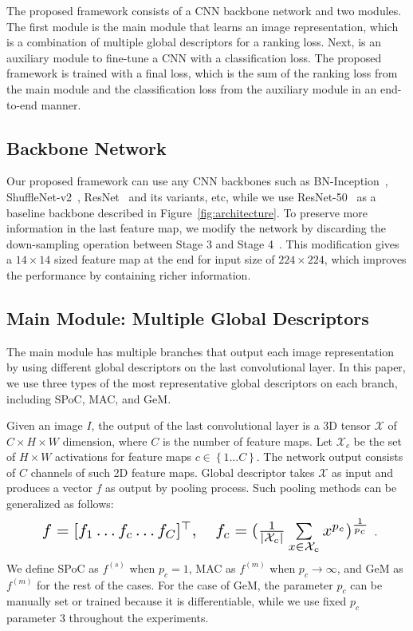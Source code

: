 \documentclass[10pt,twocolumn,letterpaper]{article}
\begin{document}
\begin{CJK}{UTF8}{mj}
The proposed framework consists of a CNN backbone network and two modules.
The first module is the main module that learns an image representation, which is a combination of multiple global descriptors for a ranking loss.
Next, is an auxiliary module to fine-tune a CNN with a classification loss.
The proposed framework is trained with a final loss, which is the sum of the ranking loss from the main module and the classification loss from the auxiliary module in an end-to-end manner.

\subsection{Backbone Network}

Our proposed framework can use any CNN backbones such as BN-Inception~\cite{ioffe2015batch}, ShuffleNet-v2~\cite{ma2018shufflenet}, ResNet~\cite{he2016deep} and its variants, etc, while we use ResNet-50~\cite{he2016deep} as a baseline backbone described in Figure~\ref{fig:architecture}.
To preserve more information in the last feature map, we modify the network by discarding the down-sampling operation between Stage 3 and Stage 4~\cite{dai2018batch, wang2018learning}.
This modification gives a $14 \times 14$ sized feature map at the end for input size of $224 \times 224$, which improves the performance by containing richer information.

\subsection{Main Module: Multiple Global Descriptors} \label{sec:main_module}

The main module has multiple branches that output each image representation by using different global descriptors on the last convolutional layer.
In this paper, we use three types of the most representative global descriptors on each branch, including SPoC, MAC, and GeM.

Given an image $I$, the output of the last convolutional layer is a 3D tensor $\mathcal{X}$ of $C \times H \times W$ dimension, where $C$ is the number of feature maps.
Let $\mathcal{X}_{c}$ be the set of $H \times W$ activations for feature maps $c \in \left\{ 1 \ldots C \right\}$.
The network output consists of $C$ channels of such 2D feature maps.
Global descriptor takes $\mathcal{X}$ as input and produces a vector $f$ as output by pooling process.
Such pooling methods can be generalized as follows:
\begin{equation} \label{eq:gem}
\resizebox{.88\hsize}{!}{
    $f = [ f_1 \ldots f_c \ldots f_C ]^\top, \quad f_c = ({1 \over \left|\mathcal{X}_{c} \right|} \sum\limits_{x \in {\mathcal{X}_{c}}} x^{p_{c}})^{{1 \over p_{c}}}$
}.
\end{equation}
We define SPoC as $f^{(s)}$ when $p_{c} = 1$, MAC as $f^{(m)}$ when $p_{c} \rightarrow \infty$, and GeM as $f^{(m)}$ for the rest of the cases.
For the case of GeM, the parameter $p_{c}$ can be manually set or trained because it is differentiable, while we use fixed $p_{c}$ parameter 3 throughout the experiments.


\end{CJK}
\end{document}
